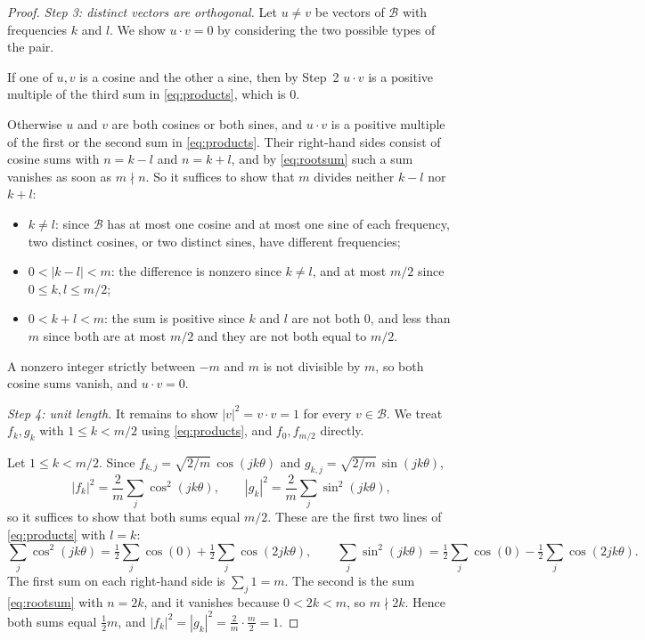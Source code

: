 \begin{proof}
  \emph{Step 3: distinct vectors are orthogonal.} Let $u \neq v$ be vectors
  of $\mathcal{B}$ with frequencies $k$ and $l$. We show $u \cdot v = 0$ by
  considering the two possible types of the pair.

  If one of $u, v$ is a cosine and the other a sine, then by Step~2
  $u \cdot v$ is a positive multiple of the third sum in
  \eqref{eq:products}, which is $0$.

  Otherwise $u$ and $v$ are both cosines or both sines, and $u \cdot v$ is
  a positive multiple of the first or the second sum in
  \eqref{eq:products}. Their right-hand sides consist of cosine sums with
  $n = k - l$ and $n = k + l$, and by \eqref{eq:rootsum} such a sum
  vanishes as soon as $m \nmid n$. So it suffices to show that $m$ divides
  neither $k - l$ nor $k + l$:
  \begin{itemize}
    \item $k \neq l$: since $\mathcal{B}$ has at most one cosine and at most
      one sine of each frequency, two distinct cosines, or two distinct
      sines, have different frequencies;
    \item $0 < |k - l| < m$: the difference is nonzero since $k \neq l$,
      and at most $m/2$ since $0 \leq k, l \leq m/2$;
    \item $0 < k + l < m$: the sum is positive since $k$ and $l$ are not
      both $0$, and less than $m$ since both are at most $m/2$ and they are
      not both equal to $m/2$.
  \end{itemize}
  A nonzero integer strictly between $-m$ and $m$ is not divisible by $m$,
  so both cosine sums vanish, and $u \cdot v = 0$.

  \emph{Step 4: unit length.} It remains to show $|v|^{2} = v \cdot v = 1$
  for every $v \in \mathcal{B}$. We treat $f_{k}, g_{k}$ with
  $1 \leq k < m/2$ using \eqref{eq:products}, and $f_{0}, f_{m/2}$
  directly.

  Let $1 \leq k < m/2$. Since $f_{k,j} = \sqrt{2/m}\,\cos(jk\theta)$ and
  $g_{k,j} = \sqrt{2/m}\,\sin(jk\theta)$,
  \[
    |f_{k}|^{2} = \frac{2}{m} \sum_{j} \cos^{2}(jk\theta),
    \qquad
    |g_{k}|^{2} = \frac{2}{m} \sum_{j} \sin^{2}(jk\theta),
  \]
  so it suffices to show that both sums equal $m/2$. These are the first
  two lines of \eqref{eq:products} with $l = k$:
  \[
    \sum_{j} \cos^{2}(jk\theta)
      = \tfrac12 \sum_{j} \cos(0) + \tfrac12 \sum_{j} \cos(2jk\theta),
    \qquad
    \sum_{j} \sin^{2}(jk\theta)
      = \tfrac12 \sum_{j} \cos(0) - \tfrac12 \sum_{j} \cos(2jk\theta).
  \]
  The first sum on each right-hand side is $\sum_{j} 1 = m$. The second is
  the sum \eqref{eq:rootsum} with $n = 2k$, and it vanishes because
  $0 < 2k < m$, so $m \nmid 2k$. Hence both sums equal $\tfrac12 m$, and
  $|f_{k}|^{2} = |g_{k}|^{2} = \frac{2}{m} \cdot \frac{m}{2} = 1$.


\end{proof}
